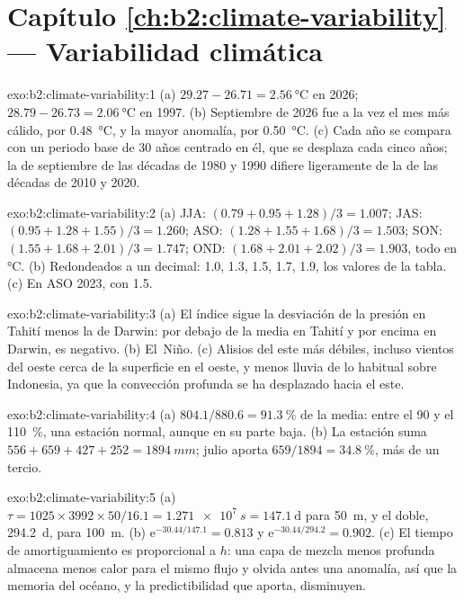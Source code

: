 \section*{Capítulo \ref{ch:b2:climate-variability} --- Variabilidad climática}

\begin{solution}{exo:b2:climate-variability:1}
(a) $29.27 - 26.71 = \qty{2.56}{\celsius}$ en 2026; $28.79 - 26.73 = \qty{2.06}{\celsius}$ en 1997.
(b) Septiembre de 2026 fue a la vez el mes más cálido, por \qty{0.48}{\celsius}, y la mayor anomalía, por
\qty{0.50}{\celsius}. (c) Cada año se compara con un periodo base de 30 años centrado en él, que se desplaza
cada cinco años; la  de septiembre de las décadas de 1980 y 1990 difiere ligeramente de la de
las décadas de 2010 y 2020.
\end{solution}

\begin{solution}{exo:b2:climate-variability:2}
(a) JJA: $(0.79 + 0.95 + 1.28)/3 = 1.007$; JAS: $(0.95 + 1.28 + 1.55)/3 = 1.260$; ASO: $(1.28 +
1.55 + 1.68)/3 = 1.503$; SON: $(1.55 + 1.68 + 2.01)/3 = 1.747$; OND: $(1.68 + 2.01 + 2.02)/3 =
1.903$, todo en \unit{\celsius}. (b) Redondeados a un decimal: 1.0, 1.3, 1.5, 1.7, 1.9, los valores de
la tabla. (c) En ASO 2023, con 1.5.
\end{solution}

\begin{solution}{exo:b2:climate-variability:3}
(a) El índice sigue la desviación de la presión en Tahití menos la de Darwin: por debajo de la media
en Tahití y por encima en Darwin, es negativo. (b) El~Niño. (c) Alisios del este más débiles, incluso
vientos del oeste cerca de la superficie en el oeste, y menos lluvia de lo habitual sobre Indonesia, ya que la
convección profunda se ha desplazado hacia el este.
\end{solution}

\begin{solution}{exo:b2:climate-variability:4}
(a) $804.1/880.6 = \qty{91.3}{\percent}$ de la media: entre el 90 y el \qty{110}{\percent}, una
estación normal, aunque en su parte baja. (b) La estación suma $556 + 659 + 427 + 252 =
\qty{1894}{mm}$; julio aporta $659/1894 = \qty{34.8}{\percent}$, más de un tercio.
\end{solution}

\begin{solution}{exo:b2:climate-variability:5}
(a) $\tau = 1025 \times 3992 \times 50/16.1 = \qty{1.271e7}{s} = \qty{147.1}{\day}$ para
\qty{50}{m}, y el doble, \qty{294.2}{\day}, para \qty{100}{m}. (b) $\mathrm{e}^{-30.44/147.1} =
0.813$ y $\mathrm{e}^{-30.44/294.2} = 0.902$. (c) El tiempo de amortiguamiento es proporcional a $h$: una
capa de mezcla menos profunda almacena menos calor para el mismo flujo y olvida antes una anomalía, así que la
memoria del océano, y la predictibilidad que aporta, disminuyen.
\end{solution}

